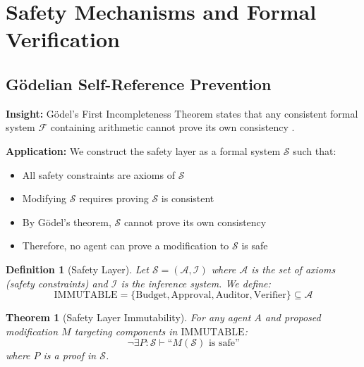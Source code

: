 \documentclass[11pt,letterpaper]{article}
\newtheorem{theorem}{Theorem}
\newtheorem{definition}{Definition}
\begin{document}
\section{Safety Mechanisms and Formal Verification}
\label{sec:safety}

\subsection{Gödelian Self-Reference Prevention}
\label{sec:godelian}

\textbf{Insight:} Gödel's First Incompleteness Theorem states that any consistent formal system $\mathcal{F}$ containing arithmetic cannot prove its own consistency \citep{godel1931formal}.

\textbf{Application:} We construct the safety layer as a formal system $\mathcal{S}$ such that:
\begin{itemize}
\item All safety constraints are axioms of $\mathcal{S}$
\item Modifying $\mathcal{S}$ requires proving $\mathcal{S}$ is consistent
\item By Gödel's theorem, $\mathcal{S}$ cannot prove its own consistency
\item Therefore, no agent can prove a modification to $\mathcal{S}$ is safe
\end{itemize}

\begin{definition}[Safety Layer]
Let $\mathcal{S} = (\mathcal{A}, \mathcal{I})$ where $\mathcal{A}$ is the set of axioms (safety constraints) and $\mathcal{I}$ is the inference system. We define:
$$\text{IMMUTABLE} = \{\text{Budget}, \text{Approval}, \text{Auditor}, \text{Verifier}\} \subseteq \mathcal{A}$$
\end{definition}

\begin{theorem}[Safety Layer Immutability]
\label{thm:immutable}
For any agent $A$ and proposed modification $M$ targeting components in $\text{IMMUTABLE}$:
$$\neg \exists P : \mathcal{S} \vdash \text{``}M(\mathcal{S}) \text{ is safe''}$$
where $P$ is a proof in $\mathcal{S}$.
\end{theorem}
\end{document}
